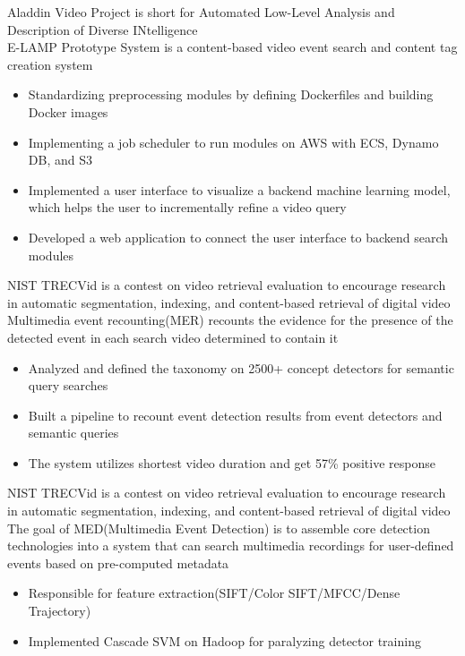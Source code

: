 \documentclass{resume}
\begin{document}
Aladdin Video Project is short for Automated Low-Level Analysis and Description of Diverse INtelligence\\
E-LAMP Prototype System is a content-based video event search and content tag creation system
\begin{itemize}
  \item Standardizing preprocessing modules by defining Dockerfiles and building Docker images
  \item Implementing a job scheduler to run modules on AWS with ECS, Dynamo DB, and S3
  \item Implemented a user interface to visualize a backend machine learning model, which helps the
user to incrementally refine a video query
  \item Developed a web application to connect the user interface to backend search modules
\end{itemize}

NIST TRECVid is a contest on video retrieval evaluation to encourage research in automatic segmentation, indexing, and content-based retrieval of digital video\\
Multimedia event recounting(MER) recounts the evidence for the presence of the detected event in each search video determined to contain it
\begin{itemize}
  \item Analyzed and defined the taxonomy on 2500+ concept detectors for semantic query searches
  \item Built a pipeline to recount event detection results from event detectors and semantic queries
  \item The system utilizes shortest video duration and get 57\% positive response
\end{itemize}

NIST TRECVid is a contest on video retrieval evaluation to encourage research in automatic segmentation, indexing, and content-based retrieval of digital video\\
The goal of MED(Multimedia Event Detection) is to assemble core detection technologies into a system that can search multimedia recordings for user-defined events based on pre-computed metadata
\begin{itemize}
  \item Responsible for feature extraction(SIFT/Color SIFT/MFCC/Dense Trajectory)
  \item  Implemented Cascade SVM on Hadoop for paralyzing detector training 
\end{itemize}
\end{document}
